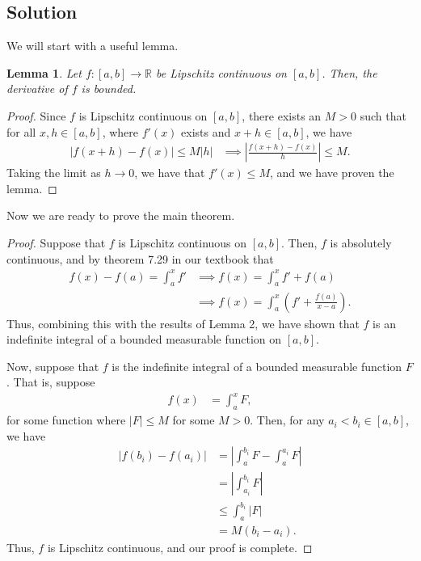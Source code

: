\documentclass[10pt,a4paper]{article}
\theoremstyle{theorem}
\newtheorem{lemma}{Lemma}
\theoremstyle{definition}
\begin{document}
\subsection*{Solution}
We will start with a useful lemma.
\begin{lemma}
Let $f:[a, b] \to \mathbb{R}$ be Lipschitz continuous on $[a, b]$. Then, the derivative of $f$ is bounded.
\end{lemma}

\begin{proof}
Since $f$ is Lipschitz continuous on $[a, b]$, there exists an $M > 0$ such that for all $x, h \in [a, b]$, where $f'(x)$ exists and $x + h \in [a, b]$, we have
\begin{align*}
|f(x + h) - f(x)| \leq M |h| &\implies \left| \frac{f(x+h) - f(x)}{h} \right| \leq M.
\end{align*}
Taking the limit as $h \to 0$, we have that $f'(x) \leq M$, and we have proven the lemma.
\end{proof}

Now we are ready to prove the main theorem.
\begin{proof}
Suppose that $f$ is Lipschitz continuous on $[a, b]$. Then, $f$ is absolutely continuous, and by theorem 7.29 in our textbook that
\begin{align*}
f(x) - f(a) = \int_a^x f' &\implies f(x) = \int_a^x f' + f(a)\\
&\implies f(x) = \int_a^x \left(f' + \frac{f(a)}{x - a}\right).
\end{align*}
Thus, combining this with the results of Lemma 2, we have shown that $f$ is an indefinite integral of a bounded measurable function on $[a, b]$.

Now, suppose that $f$ is the indefinite integral of a bounded measurable function $F$. That is, suppose
\begin{align*}
f(x) &= \int_a^x F,
\end{align*}
for some function where $|F| \leq M$ for some $M > 0$. Then, for any $a_i < b_i \in [a, b]$, we have
\begin{align*}
|f(b_i) - f(a_i)| &= \left|\int_a^{b_i} F - \int_a^{a_i} F \right|\\
&= \left|\int_{a_i}^{b_i} F \right|\\
&\leq \int_a^{b_i} |F|\\
&= M(b_i - a_i).
\end{align*}
Thus, $f$ is Lipschitz continuous, and our proof is complete.
\end{proof}
\end{document}
